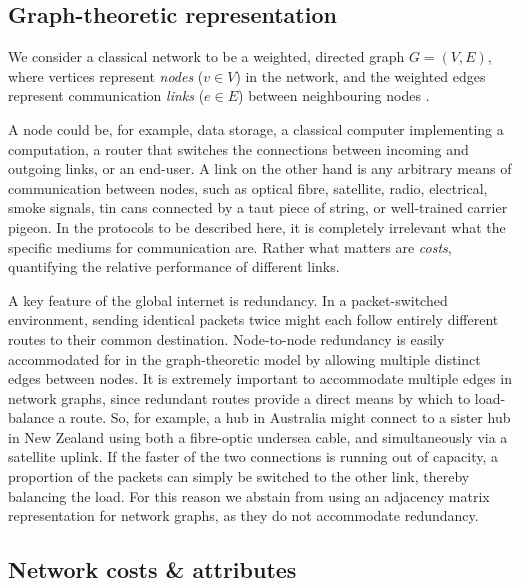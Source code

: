 \documentclass[aps,rmp,twocolumn,amsmath,amssymb,nofootinbib,superscriptaddress,longbibliography,floatfix,table-of-contents,eqsecnum]{revtex4-1}
\begin{document}
%
%

\subsection{Graph-theoretic representation} 

We consider a classical network to be a weighted, directed graph \mbox{$G=(V,E)$}, where vertices represent \textit{nodes} (\mbox{$v\in V$}) in the network, and the weighted edges represent communication \textit{links} (\mbox{$e\in E$}) between neighbouring nodes \cite{???}.

A node could be, for example, data storage, a classical computer implementing a computation, a router that switches the connections between incoming and outgoing links, or an end-user. A link on the other hand is any arbitrary means of communication between nodes, such as optical fibre, satellite, radio, electrical, smoke signals, tin cans connected by a taut piece of string, or well-trained carrier pigeon. In the protocols to be described here, it is completely irrelevant what the specific mediums for communication are. Rather what matters are \textit{costs}, quantifying the relative performance of different links.

A key feature of the global internet is redundancy. In a packet-switched environment, sending identical packets twice might each follow entirely different routes to their common destination. Node-to-node redundancy is easily accommodated for in the graph-theoretic model by allowing multiple distinct edges between nodes. It is extremely important to accommodate multiple edges in network graphs, since redundant routes provide a direct means by which to load-balance a route. So, for example, a hub in Australia might connect to a sister hub in New Zealand using both a fibre-optic undersea cable, and simultaneously via a satellite uplink. If the faster of the two connections is running out of capacity, a proportion of the packets can simply be switched to the other link, thereby balancing the load. For this reason we abstain from using an adjacency matrix representation for network graphs, as they do not accommodate redundancy.

%
%

\subsection{Network costs \& attributes} \label{sec:costs} 
\end{document}
